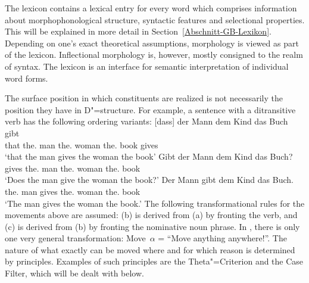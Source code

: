 The lexicon contains a lexical entry for every word which comprises information about morphophonological structure, syntactic features
and selectional properties. This will be explained in more detail in Section~\ref{Abschnitt-GB-Lexikon}. Depending on one's exact theoretical
assumptions, morphology is viewed as part of the lexicon. Inflectional morphology is, however, mostly consigned
to the realm of syntax. The lexicon is an interface for semantic interpretation of individual word forms.

\addlines
The surface position in which constituents are realized is not necessarily the position they have in
D"=structure. For example, a sentence with a ditransitive verb has the following ordering variants:
\eal
\ex 
\gll {}[dass] der Mann dem Kind das Buch gibt\\
     {}\spacebr{}that the.\nom{} man the.\dat{} woman the.\acc{} book gives\\
\glt `that the man gives the woman the book'
\ex 
\gll Gibt der Mann dem Kind das Buch?\\
	 gives the.\nom{} man the.\dat{} woman the.\acc{} book\\
\glt `Does the man give the woman the book?'
\ex 
\gll Der Mann gibt dem Kind das Buch.\\
	 the.\nom{} man gives the.\dat{} woman the.\acc{} book\\
\glt `The man gives the woman the book.'
\zl
The following transformational rules for the movements above are assumed: (b) is derived from (a) by fronting the verb, 
and (c) is derived from (b) by fronting the nominative noun phrase. In \gbt, there is only one very general transformation:
Move~$\alpha$ = ``Move anything anywhere!''. The nature of what exactly can be moved where and for which reason is determined
by principles. Examples of such principles are the Theta"=Criterion and the Case Filter, which will be
dealt with below.

